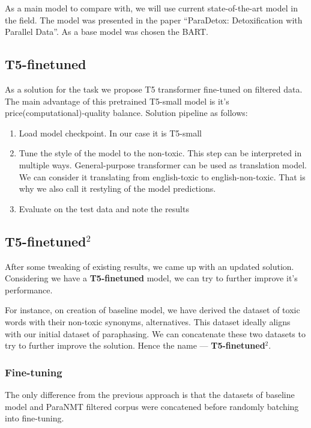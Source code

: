 As a main model to compare with, we will use current state-of-the-art model in
the field. The model was presented in the paper ``ParaDetox: Detoxification
with Parallel Data''. As a base model was chosen the BART.~\cite{}

\subsection{T5-finetuned}

As a solution for the task we propose T5 transformer fine-tuned on filtered
data. The main advantage of this pretrained T5-small model is it's
price(computational)-quality balance. Solution pipeline as follows:

\begin{enumerate}
      \item Load model checkpoint. In our case it is T5-small

      \item

            Tune the style of the model to the non-toxic. This step can be interpreted in
            multiple ways. General-purpose transformer can be used as translation model. We
            can consider it translating from english-toxic to english-non-toxic. That is
            why we also call it restyling of the model predictions.

      \item Evaluate on the test data and note the results
\end{enumerate}

\subsection{T5-finetuned\(^2\)}

After some tweaking of existing results, we came up with an updated solution.
Considering we have a \textbf{T5-finetuned} model, we can try to further
improve it's performance.

For instance, on creation of baseline model, we have derived the dataset of
toxic words with their non-toxic synonyms, alternatives. This dataset ideally
aligns with our initial dataset of paraphasing. We can concatenate these two
datasets to try to further improve the solution. Hence the name ---
\textbf{T5-finetuned\(^2\)}.

\subsubsection{Fine-tuning}

The only difference from the previous approach is that the datasets of baseline
model and ParaNMT filtered corpus were concatened before randomly batching into
fine-tuning.